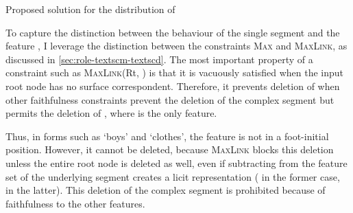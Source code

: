\begin{table}
\centering
{}
\caption{Proposed solution for the distribution of \ipa{[h]}}
\label{tab:h-solution}
\end{table}

To capture the distinction between the behaviour of the single segment \ipa{[h]} and the feature , I leverage the distinction between the constraints \textsc{Max} and \textsc{MaxLink}, as discussed in \cref{sec:role-textscm-textscd}. The most important property of a constraint such as \textsc{MaxLink}(Rt, ) is that it is vacuously satisfied when the input root node has no surface correspondent. Therefore, it prevents deletion of  when other faithfulness constraints prevent the deletion of the complex segment but permits the deletion of \ipa{[h]}, where  is the only feature.

Thus, in forms such as \ipa{[ˈkrute]} `boys' and \ipa{[ˈdiɬad]} `clothes', the feature  is not in a foot-initial position. However, it cannot be deleted, because \textsc{MaxLink} blocks this deletion unless the entire root node is deleted as well, even if subtracting  from the feature set of the underlying segment creates a licit representation (\ipa{[d]} in the former case, \ipa{[o]} in the latter). This deletion of the complex segment is prohibited because of faithfulness to the other features.

